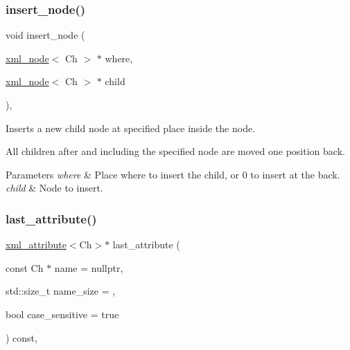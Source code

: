 \subsubsection{\texorpdfstring{insert\+\_\+node()}{insert\_node()}}
{\footnotesize\ttfamily void insert\+\_\+node (\begin{DoxyParamCaption}\item[{\mbox{\hyperlink{classrapidxml_1_1xml__node}{xml\+\_\+node}}$<$ Ch $>$ $\ast$}]{where,  }\item[{\mbox{\hyperlink{classrapidxml_1_1xml__node}{xml\+\_\+node}}$<$ Ch $>$ $\ast$}]{child }\end{DoxyParamCaption})\hspace{0.3cm}{\ttfamily [inline]}, {\ttfamily [inherited]}}



Inserts a new child node at specified place inside the node. 

All children after and including the specified node are moved one position back. 
\begin{DoxyParams}{Parameters}
{\em where} & Place where to insert the child, or 0 to insert at the back. \\
\hline
{\em child} & Node to insert. \\
\hline
\end{DoxyParams}
\mbox{\label{classrapidxml_1_1xml__node_aac6275f8fc7ce79f9a7732240cf1428c}} 
\subsubsection{\texorpdfstring{last\+\_\+attribute()}{last\_attribute()}}
{\footnotesize\ttfamily \mbox{\hyperlink{classrapidxml_1_1xml__attribute}{xml\+\_\+attribute}}$<$Ch$>$$\ast$ last\+\_\+attribute (\begin{DoxyParamCaption}\item[{const Ch $\ast$}]{name = {\ttfamily nullptr},  }\item[{std\+::size\+\_\+t}]{name\+\_\+size = {},  }\item[{bool}]{case\+\_\+sensitive = {\ttfamily true} }\end{DoxyParamCaption}) const\hspace{0.3cm}{\ttfamily [inline]}, {\ttfamily [inherited]}}



